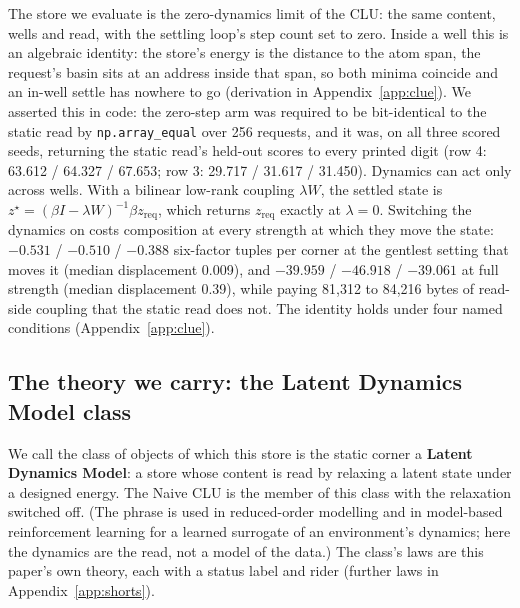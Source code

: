 \documentclass{article} %
\begin{document}
The store we evaluate is the zero-dynamics limit of the CLU: the same content, wells and read,
with the settling loop's step count set to zero. Inside a well this is an algebraic identity: the store's energy is the distance to the atom span, the request's basin sits at an address inside that span, so both minima coincide and an in-well settle has nowhere
to go (derivation in Appendix~\ref{app:clue}). We asserted this in code: the zero-step arm was required to be bit-identical to
the static read by \texttt{np.array\_equal} over 256 requests, and it was, on all three scored
seeds, returning the static read's held-out scores to every printed digit (row 4: 63.612 /
64.327 / 67.653; row 3: 29.717 / 31.617 / 31.450). %
Dynamics can act only across wells. With a bilinear low-rank coupling $\lambda W$, the settled
state is $z^\star=(\beta I-\lambda W)^{-1}\beta z_{\text{req}}$, which returns
$z_{\text{req}}$ exactly at $\lambda=0$. Switching the dynamics on costs composition at every
strength at which they move the state: $-0.531$ / $-0.510$ / $-0.388$ six-factor tuples per
corner at the gentlest setting that moves it (median displacement 0.009), and $-39.959$ /
$-46.918$ / $-39.061$ at full strength (median displacement 0.39), while paying 81,312 to 84,216 bytes of read-side coupling that the static read does not. %
The identity holds under four named conditions (Appendix~\ref{app:clue}).

\subsection{The theory we carry: the Latent Dynamics Model class}
\label{sec:theory}

We call the class of objects of which this store is the static corner a \textbf{Latent Dynamics
Model}: a store whose content is read by relaxing a latent state under a designed energy. The
Naive CLU is the member of this class with the relaxation switched off. (The phrase is used in
reduced-order modelling and in model-based reinforcement learning for a learned surrogate of an
environment's dynamics; here the dynamics are the read, not a model of the data.) The class's laws are this paper's own theory, each with a status label and rider (further laws in
Appendix~\ref{app:shorts}).
\end{document}

